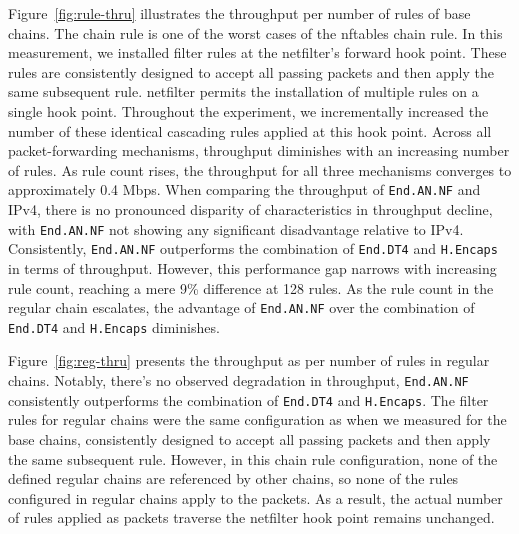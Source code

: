Figure~\ref{fig:rule-thru} illustrates the throughput per number of rules of base chains.
The chain rule is one of the worst cases of the nftables chain rule.
In this measurement, we installed filter rules at the netfilter's forward hook point.
These rules are consistently designed to accept all passing packets and then apply the same subsequent rule.
netfilter permits the installation of multiple rules on a single hook point.
Throughout the experiment, we incrementally increased the number of these identical cascading rules applied at this hook point.
Across all packet-forwarding mechanisms, throughput diminishes with an increasing number of rules.
As rule count rises, the throughput for all three mechanisms converges to approximately 0.4 Mbps.
When comparing the throughput of \texttt{End.AN.NF} and IPv4, there is no pronounced disparity of characteristics in throughput decline, with \texttt{End.AN.NF} not showing any significant disadvantage relative to IPv4.
Consistently, \texttt{End.AN.NF} outperforms the combination of \texttt{End.DT4} and \texttt{H.Encaps} in terms of throughput.
However, this performance gap narrows with increasing rule count, reaching a mere 9\% difference at 128 rules.
As the rule count in the regular chain escalates, the advantage of \texttt{End.AN.NF} over the combination of \texttt{End.DT4} and \texttt{H.Encaps} diminishes.


Figure~\ref{fig:reg-thru} presents the throughput as per number of rules in regular chains.
Notably, there's no observed degradation in throughput, \texttt{End.AN.NF} consistently outperforms the combination of \texttt{End.DT4} and \texttt{H.Encaps}.
The filter rules for regular chains were the same configuration as when we measured for the base chains, consistently designed to accept all passing packets and then apply the same subsequent rule.
However, in this chain rule configuration, none of the defined regular chains are referenced by other chains, so none of the rules configured in regular chains apply to the packets.
As a result, the actual number of rules applied as packets traverse the netfilter hook point remains unchanged.

